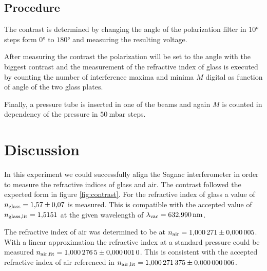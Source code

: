\subsection{Procedure}
The contrast is determined by changing the angle of the polarization filter in
$10°$ steps form $0°$ to $180°$ and measuring the resulting voltage.

After measuring the contrast the polarization will be set to the angle with the
biggest contrast and the measurement of the refractive index of glass is
executed by counting the number of interference maxima and minima $M$ digital
as function of angle of the two glass plates.

Finally, a pressure tube is inserted in one of the beams and again $M$ is
counted in dependency of the pressure in $\qty{50}{\milli\bar}$ steps.

\newpage



\section{Discussion}
In this experiment we could successfully align the Sagnac interferometer in
order to measure the refractive indices of glass and air.
The contrast followed the expected form in figure \ref{fig:contrast}.
For the refractive
index of glass a value of $n_\t{glass} = \num{1.57(7)}$ is measured. This is
compatible with the accepted value of $n_\t{glass,lit} = \num{1.5151}$
\cite{web:refglass} at the given wavelength of $\lambda_\t{vac} = \qty{632,990}{\nm}$.

The refractive index of air was determined to be at $n_\t{air}=\num{1.000271(5)}$. 
With a linear approximation the refractive index at a standard pressure
could be measured $n_\t{air,fit} = \num{1.0002765 (10)}$. This is consistent with
the accepted refractive index of air referenced in \cite*{atc:2011AmJP}
$n_\t{air,lit} = \num{1.000271375(6)}$. 

\newpage
\printbibliography


